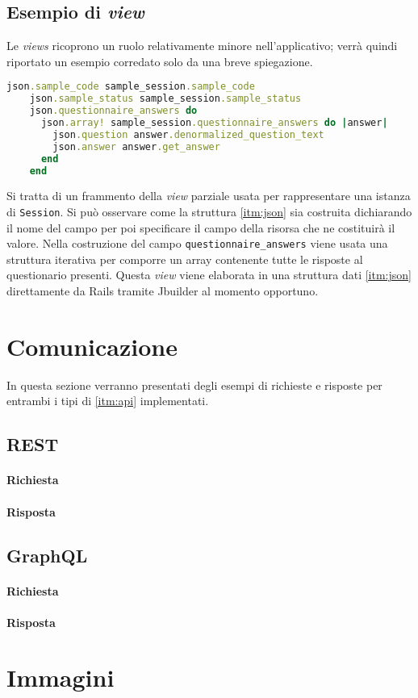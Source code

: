 \subsection{Esempio di \textit{view}}
Le \textit{views} ricoprono un ruolo relativamente minore nell'applicativo; verrà quindi riportato un esempio corredato solo da una breve spiegazione.
\begin{lstlisting}[caption={\textbf{\texttt{\_data.jbuilder}}},captionpos=b,language=Ruby]
    json.sample_code sample_session.sample_code
    json.sample_status sample_session.sample_status
    json.questionnaire_answers do
      json.array! sample_session.questionnaire_answers do |answer|
        json.question answer.denormalized_question_text
        json.answer answer.get_answer
      end
    end
\end{lstlisting}
Si tratta di un frammento della \textit{view} parziale usata per rappresentare una istanza di \texttt{Session}. Si può osservare come la struttura \ref{itm:json} sia costruita dichiarando il nome del campo per poi specificare il campo della risorsa che ne costituirà il valore.  Nella costruzione del campo \texttt{questionnaire\_answers} viene usata una struttura iterativa per comporre un array contenente tutte le risposte al questionario presenti. Questa \textit{view} viene elaborata in una struttura dati \ref{itm:json} direttamente da Rails tramite Jbuilder al momento opportuno.
\section{Comunicazione}
In questa sezione verranno presentati degli esempi di richieste e risposte per entrambi i tipi di \ref{itm:api} implementati.
\subsection{REST}
\paragraph{Richiesta}
\paragraph{Risposta}
\subsection{GraphQL}
\paragraph{Richiesta}
\paragraph{Risposta}
\section{Immagini}